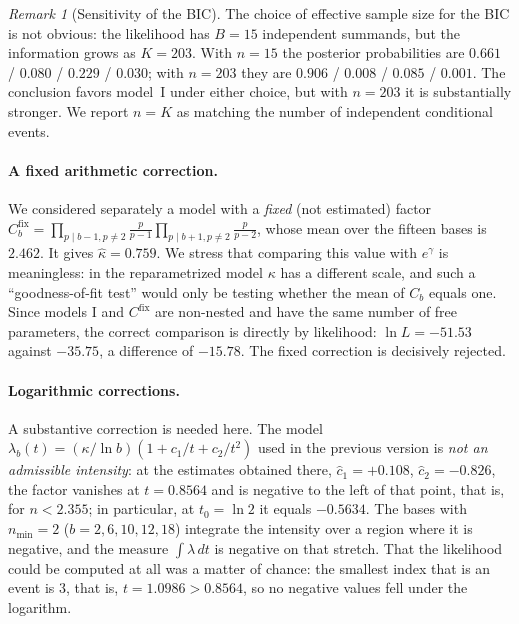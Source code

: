 \documentclass[11pt,a4paper]{article}
\theoremstyle{plain}
\theoremstyle{remark}
\newtheorem{remark}{Remark}
\newcommand{\eg}{e^{\gamma}}
\begin{document}
\begin{remark}[Sensitivity of the BIC]
The choice of effective sample size for the BIC is not obvious: the likelihood
has $B=15$ independent summands, but the information grows as $K=203$. With
$n=15$ the posterior probabilities are $0.661$ / $0.080$ / $0.229$ / $0.030$;
with $n=203$ they are $0.906$ / $0.008$ / $0.085$ / $0.001$. The conclusion
favors model~I under either choice, but with $n=203$ it is substantially
stronger. We report $n=K$ as matching the number of independent conditional
events.
\end{remark}

\paragraph{A fixed arithmetic correction.} We considered separately a model with
a \emph{fixed} (not estimated) factor
$C^{\mathrm{fix}}_b=\prod_{p\mid b-1,p\ne2}\frac{p}{p-1}\prod_{p\mid b+1,p\ne2}\frac{p}{p-2}$,
whose mean over the fifteen bases is $2.462$. It gives $\hat\kappa=0.759$. We
stress that comparing this value with $\eg$ is meaningless: in the
reparametrized model $\kappa$ has a different scale, and such a ``goodness-of-fit
test'' would only be testing whether the mean of $C_b$ equals one. Since models
I and $C^{\mathrm{fix}}$ are non-nested and have the same number of free
parameters, the correct comparison is directly by likelihood: $\ln L=-51.53$
against $-35.75$, a difference of $-15.78$. The fixed correction is decisively
rejected.

\paragraph{Logarithmic corrections.} A substantive correction is needed here.
The model $\lambda_b(t)=(\kappa/\ln b)(1+c_1/t+c_2/t^2)$ used in the previous
version is \emph{not an admissible intensity}: at the estimates obtained there,
$\hat c_1=+0.108$, $\hat c_2=-0.826$, the factor vanishes at $t=0.8564$ and is
negative to the left of that point, that is, for $n<2.355$; in particular, at
$t_0=\ln 2$ it equals $-0.5634$. The bases with $n_{\min}=2$
($b=2,6,10,12,18$) integrate the intensity over a region where it is negative,
and the measure $\int\lambda\,dt$ is negative on that stretch. That the
likelihood could be computed at all was a matter of chance: the smallest index
that is an event is $3$, that is, $t=1.0986>0.8564$, so no negative values fell
under the logarithm.
\end{document}
